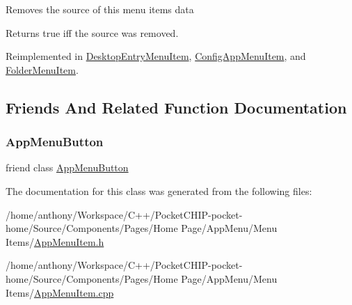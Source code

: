 Removes the source of this menu item\textquotesingle{}s data

\begin{DoxyReturn}{Returns}
true iff the source was removed. 
\end{DoxyReturn}


Reimplemented in \mbox{\hyperlink{classDesktopEntryMenuItem_a299ebe632156d897ccbde21519ed72e4}{Desktop\+Entry\+Menu\+Item}}, \mbox{\hyperlink{classConfigAppMenuItem_aa29ddde5f4f5c1e531bde3ea8f4d0ddb}{Config\+App\+Menu\+Item}}, and \mbox{\hyperlink{classFolderMenuItem_a0cddd7f7e2ac8f27e93861f058ca5094}{Folder\+Menu\+Item}}.



\subsection{Friends And Related Function Documentation}
\mbox{\label{classAppMenuItem_a80d64300ccdfd78a62e2e759ee92ec3b}} 
\subsubsection{\texorpdfstring{App\+Menu\+Button}{AppMenuButton}}
{\footnotesize\ttfamily friend class \mbox{\hyperlink{classAppMenuButton}{App\+Menu\+Button}}\hspace{0.3cm}{\ttfamily [friend]}}



The documentation for this class was generated from the following files\+:\begin{DoxyCompactItemize}
\item 
/home/anthony/\+Workspace/\+C++/\+Pocket\+C\+H\+I\+P-\/pocket-\/home/\+Source/\+Components/\+Pages/\+Home Page/\+App\+Menu/\+Menu Items/\mbox{\hyperlink{AppMenuItem_8h}{App\+Menu\+Item.\+h}}\item 
/home/anthony/\+Workspace/\+C++/\+Pocket\+C\+H\+I\+P-\/pocket-\/home/\+Source/\+Components/\+Pages/\+Home Page/\+App\+Menu/\+Menu Items/\mbox{\hyperlink{AppMenuItem_8cpp}{App\+Menu\+Item.\+cpp}}\end{DoxyCompactItemize}
